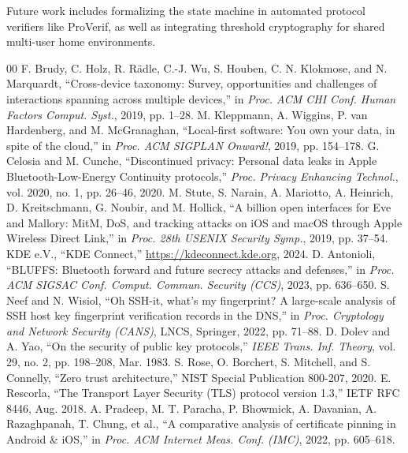\documentclass[conference]{IEEEtran}
\begin{document}
Future work includes formalizing the state machine in automated protocol verifiers like ProVerif, as well as integrating threshold cryptography for shared multi-user home environments.

\begin{thebibliography}{00}
 F. Brudy, C. Holz, R. R{\"a}dle, C.-J. Wu, S. Houben, C. N. Klokmose, and N. Marquardt, ``Cross-device taxonomy: Survey, opportunities and challenges of interactions spanning across multiple devices,'' in \textit{Proc. ACM CHI Conf. Human Factors Comput. Syst.}, 2019, pp. 1--28.
 M. Kleppmann, A. Wiggins, P. van Hardenberg, and M. McGranaghan, ``Local-first software: You own your data, in spite of the cloud,'' in \textit{Proc. ACM SIGPLAN Onward!}, 2019, pp. 154--178.
 G. Celosia and M. Cunche, ``Discontinued privacy: Personal data leaks in Apple Bluetooth-Low-Energy Continuity protocols,'' \textit{Proc. Privacy Enhancing Technol.}, vol. 2020, no. 1, pp. 26--46, 2020.
 M. Stute, S. Narain, A. Mariotto, A. Heinrich, D. Kreitschmann, G. Noubir, and M. Hollick, ``A billion open interfaces for Eve and Mallory: MitM, DoS, and tracking attacks on iOS and macOS through Apple Wireless Direct Link,'' in \textit{Proc. 28th USENIX Security Symp.}, 2019, pp. 37--54.
 KDE e.V., ``KDE Connect,'' \url{https://kdeconnect.kde.org}, 2024.
 D. Antonioli, ``BLUFFS: Bluetooth forward and future secrecy attacks and defenses,'' in \textit{Proc. ACM SIGSAC Conf. Comput. Commun. Security (CCS)}, 2023, pp. 636--650.
 S. Neef and N. Wisiol, ``Oh SSH-it, what's my fingerprint? A large-scale analysis of SSH host key fingerprint verification records in the DNS,'' in \textit{Proc. Cryptology and Network Security (CANS)}, LNCS, Springer, 2022, pp. 71--88.
 D. Dolev and A. Yao, ``On the security of public key protocols,'' \textit{IEEE Trans. Inf. Theory}, vol. 29, no. 2, pp. 198--208, Mar. 1983.
 S. Rose, O. Borchert, S. Mitchell, and S. Connelly, ``Zero trust architecture,'' NIST Special Publication 800-207, 2020.
 E. Rescorla, ``The Transport Layer Security (TLS) protocol version 1.3,'' IETF RFC 8446, Aug. 2018.
 A. Pradeep, M. T. Paracha, P. Bhowmick, A. Davanian, A. Razaghpanah, T. Chung, et al., ``A comparative analysis of certificate pinning in Android \& iOS,'' in \textit{Proc. ACM Internet Meas. Conf. (IMC)}, 2022, pp. 605--618.

\end{thebibliography}
\end{document}
